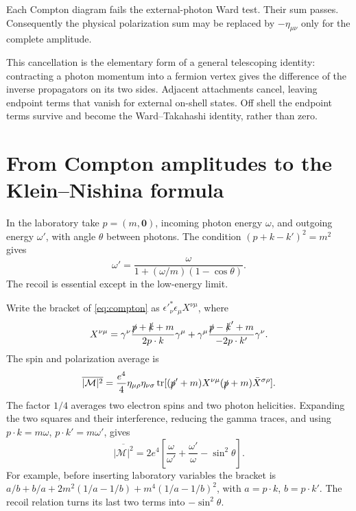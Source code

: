 \documentclass[11pt]{article}
\newcommand{\tr}{\operatorname{tr}}
\newcommand{\module}[1]{\clearpage\section{#1}}
\newcommand{\cM}{\mathcal M}
\begin{document}
\begin{keyidea}
Each Compton diagram fails the external-photon Ward test. Their sum
passes. Consequently the physical polarization sum may be replaced by
\(-\eta_{\mu\nu}\) only for the complete amplitude.
\end{keyidea}
This cancellation is the elementary form of a general telescoping
identity: contracting a photon momentum into a fermion vertex gives the
difference of the inverse propagators on its two sides. Adjacent
attachments cancel, leaving endpoint terms that vanish for external
on-shell states. Off shell the endpoint terms survive and become the
Ward--Takahashi identity, rather than zero.

\module{From Compton amplitudes to the Klein--Nishina formula}
In the laboratory take \(p=(m,\bm0)\), incoming photon energy \(\omega\),
and outgoing energy \(\omega'\), with angle \(\theta\) between photons.
The condition \((p+k-k')^2=m^2\) gives
\begin{equation}
 \omega'=\frac{\omega}{1+(\omega/m)(1-\cos\theta)}.
 \label{eq:recoil}
\end{equation}
The recoil is essential except in the low-energy limit.

Write the bracket of \eqref{eq:compton} as
\(\epsilon'^*_\nu\epsilon_\mu X^{\nu\mu}\), where
\begin{equation}
 X^{\nu\mu}=\gamma^\nu\frac{\slashed p+\slashed k+m}{2p\cdot k}\gamma^\mu
 +\gamma^\mu\frac{\slashed p-\slashed k'+m}{-2p\cdot k'}\gamma^\nu.
\end{equation}
The spin and polarization average is
\begin{equation}
 \overline{|\cM|^2}=\frac{e^4}{4}
 \eta_{\mu\rho}\eta_{\nu\sigma}
 \tr[(\slashed p'+m)X^{\nu\mu}(\slashed p+m)\bar X^{\sigma\rho}].
\end{equation}
The factor \(1/4\) averages two electron spins and two photon helicities.
Expanding the two squares and their interference, reducing the gamma
traces, and using \(p\cdot k=m\omega\), \(p\cdot k'=m\omega'\), gives
\begin{equation}
 \overline{|\cM|^2}=2e^4\left[
 \frac{\omega}{\omega'}+\frac{\omega'}{\omega}-\sin^2\theta\right].
\end{equation}
For example, before inserting laboratory variables the bracket is
\(a/b+b/a+2m^2(1/a-1/b)+m^4(1/a-1/b)^2\), with
\(a=p\cdot k\), \(b=p\cdot k'\). The recoil relation turns its last two
terms into \(-\sin^2\theta\).
\end{document}
